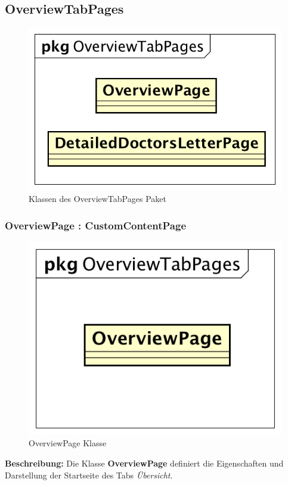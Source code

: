 \documentclass[a4paper]{scrreprt}
\begin{document}
\subsection{OverviewTabPages}
\begin{figure}[H]
\centering
\includegraphics[width=0.55\textheight]{graphics/Klassendiagramme/View/OverviewTabPages.png}
\caption{Klassen des OverviewTabPages Paket}
\end{figure}

\subsubsection{OverviewPage : CustomContentPage}
\begin{figure}[H]
\centering
\includegraphics[width=0.45\textheight]{graphics/Klassendiagramme/View/OverviewPage.png}
\caption{OverviewPage Klasse}
\end{figure}
\textbf{Beschreibung:} Die Klasse \textbf{OverviewPage} definiert die Eigenschaften und Darstellung der Startseite des Tabs \textit{Übersicht}.
\end{document}
